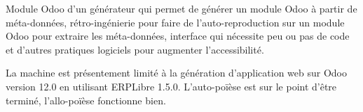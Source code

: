 Module Odoo d'un générateur qui permet de générer un module Odoo à partir de méta-données, rétro-ingénierie pour faire de l'auto-reproduction sur un module Odoo pour extraire les méta-données, interface qui nécessite peu ou pas de code et d'autres pratiques logiciels pour augmenter l'accessibilité.

La machine est présentement limité à la génération d'application web sur Odoo version 12.0 en utilisant ERPLibre 1.5.0. L'auto-poïèse est sur le point d'être terminé, l'allo-poïèse fonctionne bien.





